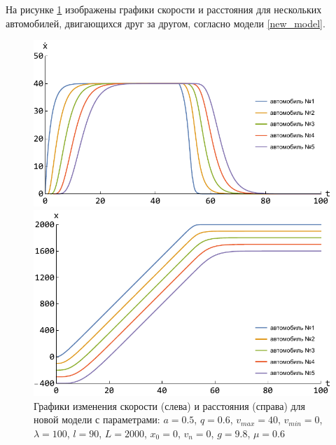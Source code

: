\documentclass[12pt, a4paper]{extarticle}
\numberwithin{equation}{section}
\begin{document}
На рисунке \ref{new_model_picture} изображены графики скорости и расстояния для нескольких автомобилей, двигающихся друг за другом, согласно модели \eqref{new_model}.

\begin{figure}[h!]
	\begin{center}
		\begin{minipage}[h!]{0.48\linewidth}
			\includegraphics[width=1\linewidth,height=0.2\textheight]
			{Images/new_model_speed.pdf}
		\end{minipage}
		\hfill 
		\begin{minipage}[h!]{0.48\linewidth}
			\includegraphics[width=1\linewidth,height=0.2\textheight]
			{Images/new_model_distanse.pdf}
		\end{minipage}
		\caption{Графики изменения скорости (слева) и расстояния (справа) для новой модели с параметрами: $a=0.5$, $q=0.6$, $v_{max}=40$, $v_{min}=0$, $\lambda=100$, $l=90$, $L=2000$, $x_0=0$, $v_n=0$, $g=9.8$, $\mu=0.6$ }
		\label{new_model_picture}
	\end{center}
\end{figure}
\end{document}
